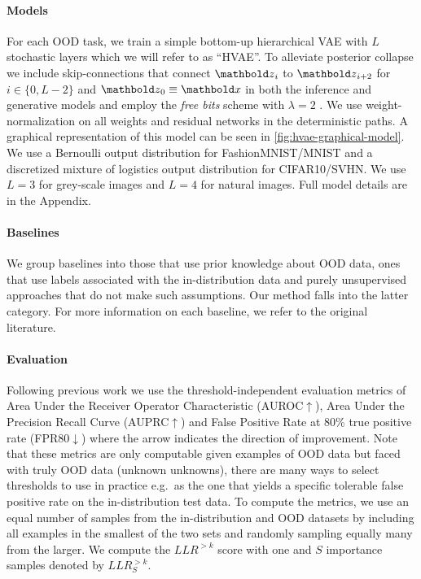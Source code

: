 \paragraph{Models} For each OOD task, we train a simple bottom-up hierarchical VAE with $L$ stochastic layers which we will refer to as ``HVAE''.
To alleviate posterior collapse we include skip-connections that connect $\zb_i$ to $\zb_{i+2}$ for $i\in\{0, L-2\}$ and $\zb_0\equiv\xb$ in both the inference and generative models \cite{dieng_avoiding_2019} and employ the \textit{free bits} scheme with $\lambda=2$ \cite{kingma_improved_2016}.
We use weight-normalization \cite{salimans_weight_2016} on all weights and residual networks in the deterministic paths. 
A graphical representation of this model can be seen in \cref{fig:hvae-graphical-model}.
We use a Bernoulli output distribution for FashionMNIST/MNIST and a discretized mixture of logistics output distribution \cite{salimans_pixelcnn_2017} for CIFAR10/SVHN.
We use $L=3$ for grey-scale images and $L=4$ for natural images.
Full model details are in the Appendix.


\paragraph{Baselines} We group baselines into those that use prior knowledge about OOD data, ones that use labels associated with the in-distribution data and purely unsupervised approaches that do not make such assumptions.
Our method falls into the latter category.
For more information on each baseline, we refer to the original literature.


\paragraph{Evaluation} Following previous work \cite{hendrycks_baseline_2017, hendrycks_deep_2019, alemi_uncertainty_2018, ren_likelihood_2019, choi_waic_2019} we use the threshold-independent evaluation metrics of Area Under the Receiver Operator Characteristic (AUROC$\uparrow$), Area Under the Precision Recall Curve (AUPRC$\uparrow$) and False Positive Rate at 80\% true positive rate (FPR80$\downarrow$) where the arrow indicates the direction of improvement.
Note that these metrics are only computable given examples of OOD data but faced with truly OOD data (unknown unknowns), there are many ways to select thresholds to use in practice e.g.\ as the one that yields a specific tolerable false positive rate on the in-distribution test data.
To compute the metrics, we use an equal number of samples from the in-distribution and OOD datasets by including all examples in the smallest of the two sets and randomly sampling equally many from the larger. We compute the $LLR^{>k}$ score with one and $S$ importance samples denoted by $LLR^{>k}_S$.

